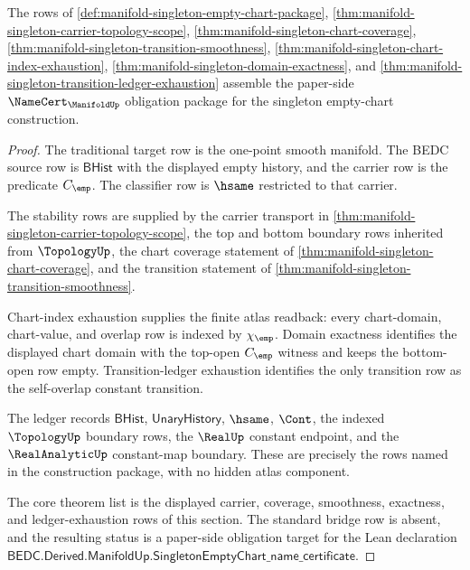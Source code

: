 \begin{theorem}
\label{thm:manifold-singleton-namecert-obligation-package}
The rows of
\autoref{def:manifold-singleton-empty-chart-package},
\autoref{thm:manifold-singleton-carrier-topology-scope},
\autoref{thm:manifold-singleton-chart-coverage},
\autoref{thm:manifold-singleton-transition-smoothness},
\autoref{thm:manifold-singleton-chart-index-exhaustion},
\autoref{thm:manifold-singleton-domain-exactness}, and
\autoref{thm:manifold-singleton-transition-ledger-exhaustion} assemble the
paper-side $\NameCert_{\ManifoldUp}$ obligation package for the singleton
empty-chart construction.
\end{theorem}
\begin{proof}
The traditional target row is the one-point smooth manifold. The BEDC source
row is $\mathsf{BHist}$ with the displayed empty history, and the carrier row
is the predicate $C_{\emp}$. The classifier row is $\hsame$ restricted to that
carrier.

The stability rows are supplied by the carrier transport in
\autoref{thm:manifold-singleton-carrier-topology-scope}, the top and bottom
boundary rows inherited from $\TopologyUp$, the chart coverage statement of
\autoref{thm:manifold-singleton-chart-coverage}, and the transition statement
of \autoref{thm:manifold-singleton-transition-smoothness}.

Chart-index exhaustion supplies the finite atlas readback: every chart-domain,
chart-value, and overlap row is indexed by $\chi_{\emp}$. Domain exactness
identifies the displayed chart domain with the top-open $C_{\emp}$ witness and
keeps the bottom-open row empty. Transition-ledger exhaustion identifies the
only transition row as the self-overlap constant transition.

The ledger records $\mathsf{BHist}$, $\mathsf{UnaryHistory}$, $\hsame$,
$\Cont$, the indexed $\TopologyUp$ boundary rows, the $\RealUp$ constant
endpoint, and the $\RealAnalyticUp$ constant-map boundary. These are precisely
the rows named in the construction package, with no hidden atlas component.

The core theorem list is the displayed carrier, coverage, smoothness,
exactness, and ledger-exhaustion rows of this section. The standard bridge row
is absent, and the resulting status is a paper-side obligation target for the
Lean declaration
$\mathsf{BEDC.Derived.ManifoldUp.SingletonEmptyChart\_name\_certificate}$.
\end{proof}

